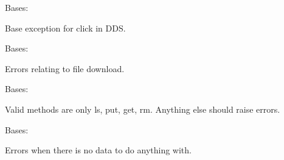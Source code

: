 \documentclass[letterpaper,10pt,english]{sphinxmanual}
\begin{document}

\begin{fulllineitems}
\label{\detokenize{dds_cli:dds_cli.exceptions.DDSCLIException}}
\sphinxAtStartPar
Bases: 

\sphinxAtStartPar
Base exception for click in DDS.

\end{fulllineitems}


\begin{fulllineitems}
\label{\detokenize{dds_cli:dds_cli.exceptions.DownloadError}}
\sphinxAtStartPar
Bases: 

\sphinxAtStartPar
Errors relating to file download.

\end{fulllineitems}


\begin{fulllineitems}
\label{\detokenize{dds_cli:dds_cli.exceptions.InvalidMethodError}}
\sphinxAtStartPar
Bases: 

\sphinxAtStartPar
Valid methods are only ls, put, get, rm. Anything else should raise errors.

\end{fulllineitems}


\begin{fulllineitems}
\label{\detokenize{dds_cli:dds_cli.exceptions.NoDataError}}
\sphinxAtStartPar
Bases: 

\sphinxAtStartPar
Errors when there is no data to do anything with.

\end{fulllineitems}
\end{document}
